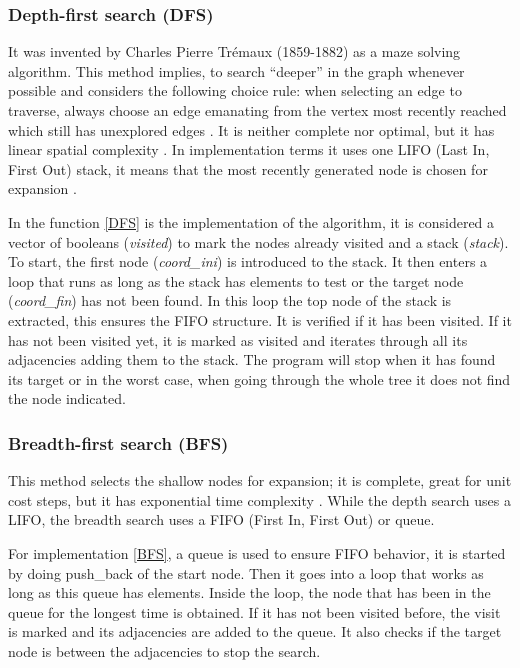 \documentclass[12pt]{article}
\begin{document}
        \subsubsection{Depth-first search (DFS)}
        It was invented by Charles Pierre Trémaux (1859-1882) \cite{tremaux2010ecole} as a maze solving algorithm.
        This method implies, to search “deeper” in the graph whenever possible \cite{cormen2009introduction} and
        considers the following choice rule: when selecting an edge to traverse, always choose an edge emanating from the vertex most recently reached which still has unexplored edges \cite{tarjan1972depth}.
        It is neither complete nor optimal, but it has linear spatial complexity \cite{russell2004inteligencia}. In implementation terms it uses one LIFO (Last In, First Out) stack, it means that the most recently generated node is chosen for expansion \cite{russell2004inteligencia}.
        
        In the function \ref{DFS} is the implementation of the algorithm, it is considered a vector of booleans (\textit{visited}) to mark the nodes already visited and a stack (\textit{stack}). To start, the first node (\textit{coord\_ini}) is introduced to the stack. It then enters a loop that runs as long as the stack has elements to test or the target node (\textit{coord\_fin}) has not been found.
        In this loop the top node of the stack is extracted, this ensures the FIFO structure. It is verified if it has been visited. If it has not been visited yet, it is marked as visited and iterates through all its adjacencies adding them to the stack. The program will stop when it has found its target or in the worst case, when going through the whole tree it does not find the node indicated.
        

        \subsubsection{Breadth-first search (BFS)}
        This method selects the shallow nodes for expansion; it is complete, great for unit cost steps, but it has exponential time complexity \cite{russell2004inteligencia}.
        While the depth search uses a LIFO, the breadth search uses a FIFO (First In, First Out) or queue. 
        
        For implementation \ref{BFS}, a queue is used to ensure FIFO behavior, it is started by doing push\_back of the start node. Then it goes into a loop that works as long as this queue has elements. Inside the loop, the node that has been in the queue for the longest time is obtained. If it has not been visited before, the visit is marked and its adjacencies are added to the queue. It also checks if the target node is between the adjacencies to stop the search.
        
\end{document}
